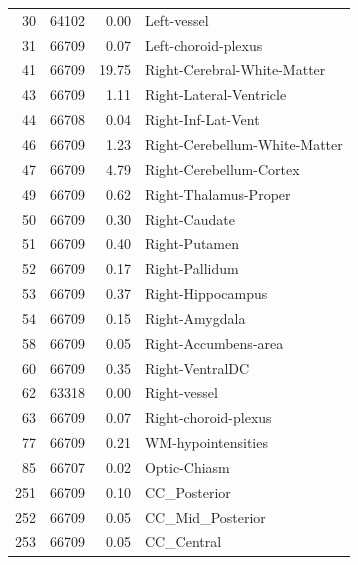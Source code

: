 \documentclass[pdflatex,sn-nature]{sn-jnl}%
\theoremstyle{thmstyleone}%
\theoremstyle{thmstyletwo}%
\theoremstyle{thmstylethree}%
\begin{document}
\begin{appendices}
\begin{small}
\begin{longtable}{r|r|r|l}
     30 &     64102 &                0.00 &                     Left-vessel \\
     31 &     66709 &                0.07 &             Left-choroid-plexus \\
     41 &     66709 &               19.75 &     Right-Cerebral-White-Matter \\
     43 &     66709 &                1.11 &         Right-Lateral-Ventricle \\
     44 &     66708 &                0.04 &              Right-Inf-Lat-Vent \\
     46 &     66709 &                1.23 &   Right-Cerebellum-White-Matter \\
     47 &     66709 &                4.79 &         Right-Cerebellum-Cortex \\
     49 &     66709 &                0.62 &           Right-Thalamus-Proper \\
     50 &     66709 &                0.30 &                   Right-Caudate \\
     51 &     66709 &                0.40 &                   Right-Putamen \\
     52 &     66709 &                0.17 &                  Right-Pallidum \\
     53 &     66709 &                0.37 &               Right-Hippocampus \\
     54 &     66709 &                0.15 &                  Right-Amygdala \\
     58 &     66709 &                0.05 &            Right-Accumbens-area \\
     60 &     66709 &                0.35 &                 Right-VentralDC \\
     62 &     63318 &                0.00 &                    Right-vessel \\
     63 &     66709 &                0.07 &            Right-choroid-plexus \\
     77 &     66709 &                0.21 &              WM-hypointensities \\
     85 &     66707 &                0.02 &                    Optic-Chiasm \\
    251 &     66709 &                0.10 &                    CC\_Posterior \\
    252 &     66709 &                0.05 &                CC\_Mid\_Posterior \\
    253 &     66709 &                0.05 &                      CC\_Central \\

\end{longtable}
\end{small}
\end{appendices}
\end{document}
